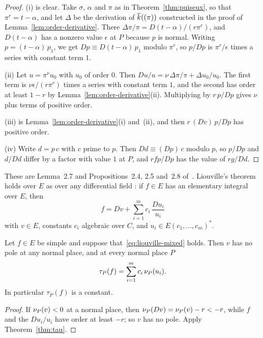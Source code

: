 \begin{proof}
(i) is clear. Take $\sigma$, $\alpha$ and $\pi$ as in
Theorem~\ref{thm:puiseux}, so that $\pi^r = t - \alpha$, and let $\Delta$ be
the derivation of $\overline{k}((\pi))$ constructed in the proof of
Lemma~\ref{lem:order-derivative}. There $\Delta\pi / \pi = D(t - \alpha) / (r
\pi^r)$, and $D(t - \alpha)$ has a nonzero value $\epsilon$ at $P$ because
$p$ is normal. Writing $p = (t - \alpha)\, p_1$, we get $Dp \equiv D(t -
\alpha)\, p_1$ modulo $\pi^r$, so $p/Dp$ is $\pi^r/\epsilon$ times a series
with constant term $1$.

(ii) Let $u = \pi^\nu u_0$ with $u_0$ of order $0$. Then $Du/u = \nu\,
\Delta\pi/\pi + \Delta u_0 / u_0$. The first term is $\nu \epsilon / (r
\pi^r)$ times a series with constant term $1$, and the second has order at
least $1 - r$ by Lemma~\ref{lem:order-derivative}(ii). Multiplying by $r\,
p/Dp$ gives $\nu$ plus terms of positive order.

(iii) is Lemma~\ref{lem:order-derivative}(i) and~(ii), and then $r\,(Dv)\,
p/Dp$ has positive order.

(iv) Write $d = p\, c$ with $c$ prime to $p$. Then $Dd \equiv (Dp)\, c$ modulo
$p$, so $p/Dp$ and $d/Dd$ differ by a factor with value $1$ at $P$, and $r f
p/Dp$ has the value of $r g/Dd$.
\end{proof}

These are Lemma~2.7 and Propositions~2.4, 2.5 and~2.8 of~\cite{bronstein1990}.
Liouville's theorem holds over $E$ as over any differential field
: if $f \in E$ has an elementary integral over $E$, then
\begin{equation}\label{eq:liouville-mixed}
  f = Dv + \sum_{i=1}^m c_i\, \frac{Du_i}{u_i}
\end{equation}
with $v \in E$, constants $c_i$ algebraic over $C$, and $u_i \in E(c_1, \dots,
c_m)^*$.

\begin{corollary}\label{cor:tau-liouville}
Let $f \in E$ be simple and suppose that~\eqref{eq:liouville-mixed} holds.
Then $v$ has no pole at any normal place, and at every normal place $P$
\[
  \tau_P(f) = \sum_{i=1}^m c_i\, \nu_{P}(u_i) .
\]
In particular $\tau_P(f)$ is a constant.
\end{corollary}

\begin{proof}
If $\nu_{P}(v) < 0$ at a normal place, then $\nu_{P}(Dv) = \nu_{P}(v) - r <
-r$, while $f$ and the $Du_i/u_i$ have order at least $-r$; so $v$ has no
pole. Apply Theorem~\ref{thm:tau}.
\end{proof}

